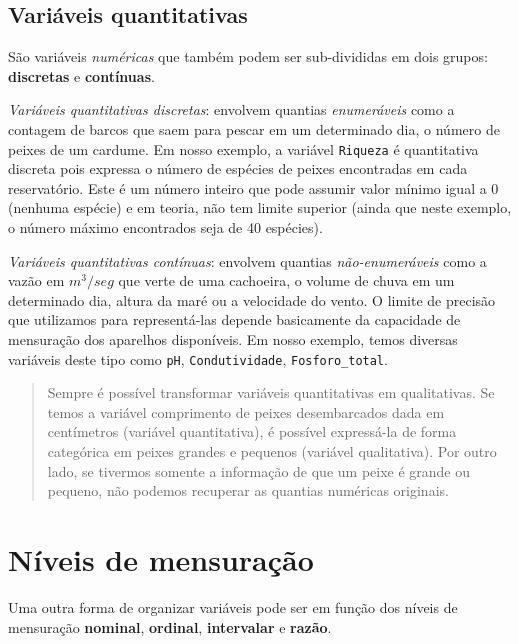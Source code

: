 \documentclass[
]{book}
\begin{document}
\hypertarget{variuxe1veis-quantitativas}{%
\subsection{Variáveis quantitativas}\label{variuxe1veis-quantitativas}}

São variáveis \emph{numéricas} que também podem ser sub-divididas em dois grupos: \textbf{discretas} e \textbf{contínuas}.

\emph{Variáveis quantitativas discretas}: envolvem quantias \emph{enumeráveis} como a contagem de barcos que saem para pescar em um determinado dia, o número de peixes de um cardume. Em nosso exemplo, a variável \texttt{Riqueza} é quantitativa discreta pois expressa o número de espécies de peixes encontradas em cada reservatório. Este é um número inteiro que pode assumir valor mínimo igual a 0 (nenhuma espécie) e em teoria, não tem limite superior (ainda que neste exemplo, o número máximo encontrados seja de 40 espécies).

\emph{Variáveis quantitativas contínuas}: envolvem quantias \emph{não-enumeráveis} como a vazão em \(m^3/seg\) que verte de uma cachoeira, o volume de chuva em um determinado dia, altura da maré ou a velocidade do vento. O limite de precisão que utilizamos para representá-las depende basicamente da capacidade de mensuração dos aparelhos disponíveis. Em nosso exemplo, temos diversas variáveis deste tipo como \texttt{pH}, \texttt{Condutividade}, \texttt{Fosforo\_total}.

\begin{quote}
Sempre é possível transformar variáveis quantitativas em qualitativas. Se temos a variável comprimento de peixes desembarcados dada em centímetros (variável quantitativa), é possível expressá-la de forma categórica em peixes grandes e pequenos (variável qualitativa). Por outro lado, se tivermos somente a informação de que um peixe é grande ou pequeno, não podemos recuperar as quantias numéricas originais.
\end{quote}

\hypertarget{nuxedveis-de-mensurauxe7uxe3o}{%
\section{Níveis de mensuração}\label{nuxedveis-de-mensurauxe7uxe3o}}

Uma outra forma de organizar variáveis pode ser em função dos níveis de mensuração \textbf{nominal}, \textbf{ordinal}, \textbf{intervalar} e \textbf{razão}.
\end{document}
